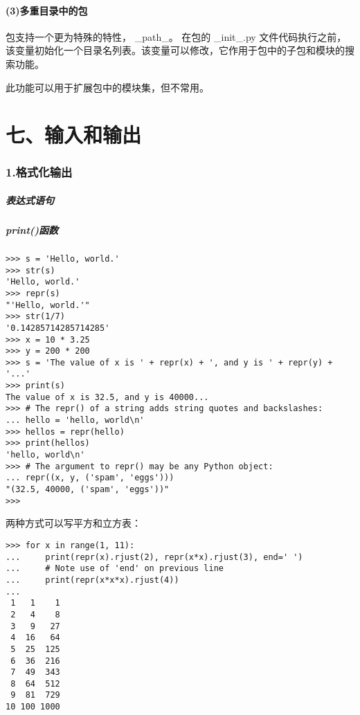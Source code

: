 \documentclass{article}
\begin{document}
\begin{CJK}{UTF8}{gbsn}
\subsection*{(3)多重目录中的包}
\subparagraph*{}
包支持一个更为特殊的特性， \_{}path\_{}。 在包的 \_{}init\_{}.py 文件代码执行之前，该变量初始化一个目录名列表。该变量可以修改，它作用于包中的子包和模块的搜索功能。
\subparagraph*{}
此功能可以用于扩展包中的模块集，但不常用。
\part*{七、输入和输出}
\section*{1.格式化输出}
\subsubsection*{表达式语句}
\subsubsection*{print()函数}
\begin{verbatim}
>>> s = 'Hello, world.'
>>> str(s)
'Hello, world.'
>>> repr(s)
"'Hello, world.'"
>>> str(1/7)
'0.14285714285714285'
>>> x = 10 * 3.25
>>> y = 200 * 200
>>> s = 'The value of x is ' + repr(x) + ', and y is ' + repr(y) + '...'
>>> print(s)
The value of x is 32.5, and y is 40000...
>>> # The repr() of a string adds string quotes and backslashes:
... hello = 'hello, world\n'
>>> hellos = repr(hello)
>>> print(hellos)
'hello, world\n'
>>> # The argument to repr() may be any Python object:
... repr((x, y, ('spam', 'eggs')))
"(32.5, 40000, ('spam', 'eggs'))"
>>>
\end{verbatim}
两种方式可以写平方和立方表：
\begin{verbatim}
>>> for x in range(1, 11):
...     print(repr(x).rjust(2), repr(x*x).rjust(3), end=' ')
...     # Note use of 'end' on previous line
...     print(repr(x*x*x).rjust(4))
...
 1   1    1
 2   4    8
 3   9   27
 4  16   64
 5  25  125
 6  36  216
 7  49  343
 8  64  512
 9  81  729
10 100 1000


\end{verbatim}
\end{CJK}
\end{document}
